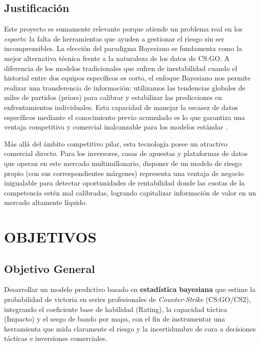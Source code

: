 \documentclass[twocolumn,10pt]{article}
\begin{document}
\subsection{Justificación}

Este proyecto es sumamente relevante porque atiende un problema real en los \textit{esports}: la falta de herramientas que ayuden a gestionar el riesgo sin ser incomprensibles. La elección del paradigma Bayesiano se fundamenta como la mejor alternativa técnica frente a la naturaleza de los datos de CS:GO. A diferencia de los modelos tradicionales que sufren de inestabilidad cuando el historial entre dos equipos específicos es corto, el enfoque Bayesiano nos permite realizar una transferencia de información: utilizamos las tendencias globales de miles de partidos (priors) para calibrar y estabilizar las predicciones en enfrentamientos individuales. Esta capacidad de manejar la escasez de datos específicos mediante el conocimiento previo acumulado es lo que garantiza una ventaja competitiva y comercial inalcanzable para los modelos estándar \citep{goldin2021bayesian}.

Más allá del ámbito competitivo pilar, esta tecnología posee un atractivo comercial directo. Para los inversores, casas de apuestas y plataformas de datos que operan en este mercado multimillonario, disponer de un modelo de riesgo propio (con sus correspondientes márgenes) representa una ventaja de negocio inigualable para detectar oportunidades de rentabilidad donde las cuotas de la competencia estén mal calibradas, logrando capitalizar información de valor en un mercado altamente líquido.

\section{OBJETIVOS}

\subsection{Objetivo General}

Desarrollar un modelo predictivo basado en \textbf{estadística bayesiana} que estime la probabilidad de victoria en series profesionales de \textit{Counter-Strike} (CS:GO/CS2), integrando el coeficiente base de habilidad (Rating), la capacidad táctica (Impacto) y el sesgo de bando por mapa, con el fin de instrumentar una herramienta que mida claramente el riesgo y la incertidumbre de cara a decisiones tácticas e inversiones comerciales.
\end{document}
